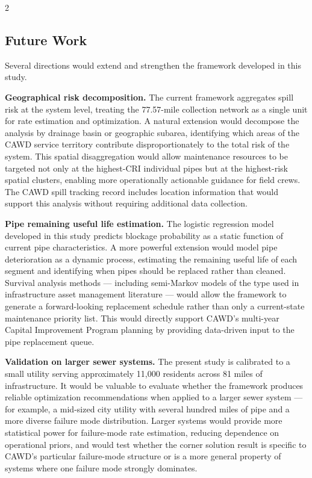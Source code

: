 \documentclass[10pt]{article}
\begin{document}
\begin{multicols}{2}
\subsection{Future Work}
 
Several directions would extend and strengthen the framework
developed in this study.
 
\textbf{Geographical risk decomposition.} The current framework
aggregates spill risk at the system level, treating the 77.57-mile
collection network as a single unit for rate estimation and
optimization. A natural extension would decompose the analysis
by drainage basin or geographic subarea, identifying which
areas of the CAWD service territory contribute disproportionately
to the total risk of the system. This spatial disaggregation would allow
maintenance resources to be targeted not only at the highest-CRI
individual pipes but at the highest-risk spatial clusters,
enabling more operationally actionable guidance for field crews.
The CAWD spill tracking record includes location information that
would support this analysis without requiring additional data
collection.
 
\textbf{Pipe remaining useful life estimation.} The logistic
regression model developed in this study predicts blockage
probability as a static function of current pipe characteristics.
A more powerful extension would model pipe deterioration as a
dynamic process, estimating the remaining useful life of each
segment and identifying when pipes should be replaced rather
than cleaned. Survival analysis methods --- including
semi-Markov models of the type used in infrastructure asset
management literature \citep{kleiner2001} --- would allow the
framework to generate a forward-looking replacement schedule
rather than only a current-state maintenance priority list.
This would directly support CAWD's multi-year Capital Improvement
Program planning by providing data-driven input to the pipe
replacement queue.
 
\textbf{Validation on larger sewer systems.} The present study
is calibrated to a small utility serving approximately 11{,}000
residents across 81 miles of infrastructure. It would be valuable
to evaluate whether the framework produces reliable optimization
recommendations when applied to a larger sewer system ---
for example, a mid-sized city utility with several hundred miles
of pipe and a more diverse failure mode distribution. Larger
systems would provide more statistical power for failure-mode
rate estimation, reducing dependence on operational priors, and
would test whether the corner solution result is specific to
CAWD's particular failure-mode structure or is a more general
property of systems where one failure mode strongly dominates.


\end{multicols}
\end{document}

